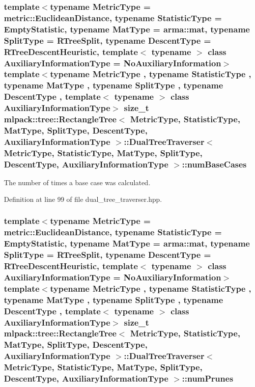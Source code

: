 \subsubsection[{num\+Base\+Cases}]{\setlength{\rightskip}{0pt plus 5cm}template$<$typename Metric\+Type  = metric\+::\+Euclidean\+Distance, typename Statistic\+Type  = Empty\+Statistic, typename Mat\+Type  = arma\+::mat, typename Split\+Type  = R\+Tree\+Split, typename Descent\+Type  = R\+Tree\+Descent\+Heuristic, template$<$ typename $>$ class Auxiliary\+Information\+Type = No\+Auxiliary\+Information$>$ template$<$typename Metric\+Type , typename Statistic\+Type , typename Mat\+Type , typename Split\+Type , typename Descent\+Type , template$<$ typename $>$ class Auxiliary\+Information\+Type$>$ size\+\_\+t {\bf mlpack\+::tree\+::\+Rectangle\+Tree}$<$ Metric\+Type, Statistic\+Type, Mat\+Type, {\bf Split\+Type}, {\bf Descent\+Type}, Auxiliary\+Information\+Type $>$\+::{\bf Dual\+Tree\+Traverser}$<$ Metric\+Type, Statistic\+Type, Mat\+Type, {\bf Split\+Type}, {\bf Descent\+Type}, Auxiliary\+Information\+Type $>$\+::num\+Base\+Cases\hspace{0.3cm}{\ttfamily [private]}}\label{classmlpack_1_1tree_1_1RectangleTree_1_1DualTreeTraverser_a637e4544ee3c2f86136718a7d66590ca}


The number of times a base case was calculated. 



Definition at line 99 of file dual\+\_\+tree\+\_\+traverser.\+hpp.

\subsubsection[{num\+Prunes}]{\setlength{\rightskip}{0pt plus 5cm}template$<$typename Metric\+Type  = metric\+::\+Euclidean\+Distance, typename Statistic\+Type  = Empty\+Statistic, typename Mat\+Type  = arma\+::mat, typename Split\+Type  = R\+Tree\+Split, typename Descent\+Type  = R\+Tree\+Descent\+Heuristic, template$<$ typename $>$ class Auxiliary\+Information\+Type = No\+Auxiliary\+Information$>$ template$<$typename Metric\+Type , typename Statistic\+Type , typename Mat\+Type , typename Split\+Type , typename Descent\+Type , template$<$ typename $>$ class Auxiliary\+Information\+Type$>$ size\+\_\+t {\bf mlpack\+::tree\+::\+Rectangle\+Tree}$<$ Metric\+Type, Statistic\+Type, Mat\+Type, {\bf Split\+Type}, {\bf Descent\+Type}, Auxiliary\+Information\+Type $>$\+::{\bf Dual\+Tree\+Traverser}$<$ Metric\+Type, Statistic\+Type, Mat\+Type, {\bf Split\+Type}, {\bf Descent\+Type}, Auxiliary\+Information\+Type $>$\+::num\+Prunes\hspace{0.3cm}{\ttfamily [private]}}\label{classmlpack_1_1tree_1_1RectangleTree_1_1DualTreeTraverser_a1db3b2b95418041a76ca0236fc1b143e}


